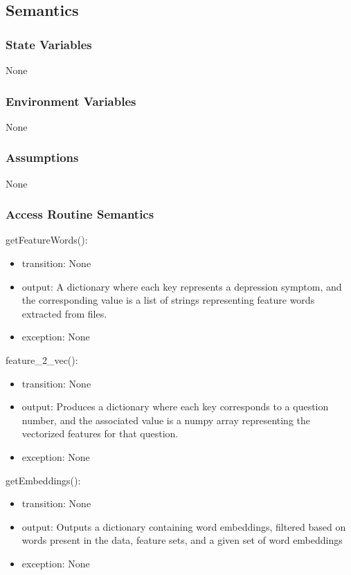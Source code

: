 \documentclass[12pt, titlepage]{article}
\begin{document}
\subsection{Semantics}

\subsubsection{State Variables}

None

\subsubsection{Environment Variables}

None

\subsubsection{Assumptions}

None

\subsubsection{Access Routine Semantics}

\noindent getFeatureWords():
\begin{itemize}
\item transition: None
\item output: A dictionary where each key represents a depression symptom, and the corresponding value is a list of strings representing feature words extracted from files.
\item exception: None
\end{itemize}

\noindent feature\_2\_vec():
\begin{itemize}
\item transition: None
\item output: Produces a dictionary where each key corresponds to a question number, and the associated value is a numpy array representing the vectorized features for that question. 
\item exception: None
\end{itemize}

\noindent getEmbeddings():
\begin{itemize}
\item transition: None
\item output: Outputs a dictionary containing word embeddings, filtered based on words present in the data, feature sets, and a given set of word embeddings
\item exception: None
\end{itemize}
\end{document}
